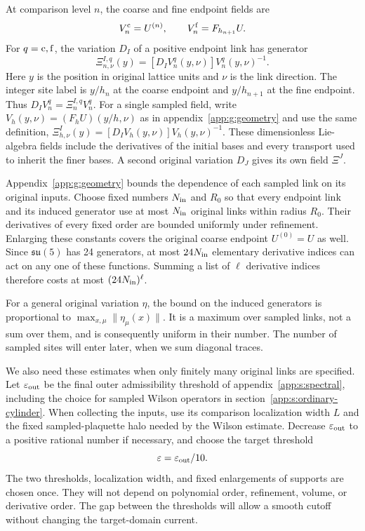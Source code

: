 \documentclass[11pt,a4paper]{article}
\theoremstyle{remark}
\newcommand{\eps}{\varepsilon}
\begin{document}
At comparison level $n$, the coarse and fine endpoint fields are
\begin{equation}
 V_n^{\rm c}=U^{(n)},\qquad V_n^{\rm f}=F_{h_{n+1}}U.
\end{equation}
For $q={\rm c},{\rm f}$, the variation $D_I$ of a positive endpoint
link has generator
\begin{equation}
 \Xi^{I,q}_{n,\nu}(y)
  =[D_I V_n^q(y,\nu)]V_n^q(y,\nu)^{-1}.
 \label{app:a:receiving-source}
\end{equation}
Here $y$ is the position in original lattice units and $\nu$ is the
link direction. The integer site label is $y/h_n$ at the coarse endpoint
and $y/h_{n+1}$ at the fine endpoint. Thus
$D_I V_n^q=\Xi^{I,q}_n V_n^q$. For a single sampled field, write
$V_h(y,\nu)=(F_hU)(y/h,\nu)$ as in appendix~\ref{app:g:geometry}
and use the same definition,
$\Xi^I_{h,\nu}(y)=[D_IV_h(y,\nu)]V_h(y,\nu)^{-1}$.
These dimensionless Lie-algebra fields include the derivatives of the
initial bases and every transport used to inherit the finer bases.
A second original variation $D_J$ gives its own field $\Xi^J$.

Appendix~\ref{app:g:geometry} bounds the dependence of each sampled
link on its original inputs. Choose fixed numbers $N_{\rm in}$ and
$R_0$ so that every endpoint link and its induced generator use at most
$N_{\rm in}$ original links within radius $R_0$. Their derivatives
of every fixed order are bounded uniformly under refinement. Enlarging
these constants covers the original coarse endpoint $U^{(0)}=U$ as
well. Since $\mathfrak{su}(5)$ has 24 generators, at most
$24N_{\rm in}$ elementary derivative indices can act on any one of
these functions. Summing a list of $\ell$ derivative indices therefore
costs at most $(24N_{\rm in})^\ell$.

For a general original variation $\eta$, the bound on the induced
generators is proportional to
$\max_{x,\mu}\|\eta_\mu(x)\|$. It is a maximum over sampled
links, not a sum over them, and is consequently uniform in their number.
The number of sampled sites will enter later, when we sum diagonal
traces.

We also need these estimates when only finitely many original links
are specified. Let $\eps_{\rm out}$ be the final outer admissibility
threshold of appendix~\ref{app:s:spectral}, including the choice for
sampled Wilson operators in section~\ref{app:s:ordinary-cylinder}.
When collecting the inputs, use its comparison localization width $L$
and the fixed sampled-plaquette halo needed by the Wilson estimate.
Decrease $\eps_{\rm out}$ to a
positive rational number if necessary, and choose the target threshold
\begin{equation}
 \eps=\eps_{\rm out}/10 .
 \label{app:a:domains}
\end{equation}
The two thresholds, localization width, and fixed enlargements of
supports are chosen once. They will not depend on polynomial order,
refinement, volume, or derivative order. The gap between the thresholds
will allow a smooth cutoff without changing the target-domain current.
\end{document}
